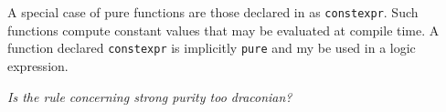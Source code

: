 A special case of pure functions are those declared in \lang{} as \lstinline|constexpr|.
Such functions compute constant values that may be evaluated at compile time. A function declared \lstinline|constexpr| is implicitly \lstinline|pure| and my be used in a logic expression.

	\emph{Is the rule concerning strong purity too draconian?}
